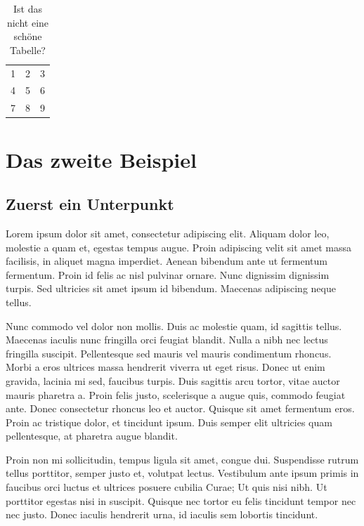 \begin{table}[]
	\begin{center}
		\begin{tabular}{| l c r |}
			\hline
			1 & 2 & 3 \\
			4 & 5 & 6 \\
			7 & 8 & 9 \\
			\hline
		\end{tabular}
	\end{center}
	\caption{Ist das nicht eine schöne Tabelle?}
\end{table}

\section{Das zweite Beispiel}

\subsection{Zuerst ein Unterpunkt}
Lorem ipsum dolor sit amet, consectetur adipiscing elit. Aliquam dolor leo, molestie a quam et, egestas tempus augue. Proin adipiscing velit sit amet massa facilisis, in aliquet magna imperdiet. Aenean bibendum ante ut fermentum fermentum. Proin id felis ac nisl pulvinar ornare. Nunc dignissim dignissim turpis. Sed ultricies sit amet ipsum id bibendum. Maecenas adipiscing neque tellus.

Nunc commodo vel dolor non mollis. Duis ac molestie quam, id sagittis tellus. Maecenas iaculis nunc fringilla orci feugiat blandit. Nulla a nibh nec lectus fringilla suscipit. Pellentesque sed mauris vel mauris condimentum rhoncus. Morbi a eros ultrices massa hendrerit viverra ut eget risus. Donec ut enim gravida, lacinia mi sed, faucibus turpis. Duis sagittis arcu tortor, vitae auctor mauris pharetra a. Proin felis justo, scelerisque a augue quis, commodo feugiat ante. Donec consectetur rhoncus leo et auctor. Quisque sit amet fermentum eros. Proin ac tristique dolor, et tincidunt ipsum. Duis semper elit ultricies quam pellentesque, at pharetra augue blandit.

Proin non mi sollicitudin, tempus ligula sit amet, congue dui. Suspendisse rutrum tellus porttitor, semper justo et, volutpat lectus. Vestibulum ante ipsum primis in faucibus orci luctus et ultrices posuere cubilia Curae; Ut quis nisi nibh. Ut porttitor egestas nisi in suscipit. Quisque nec tortor eu felis tincidunt tempor nec nec justo. Donec iaculis hendrerit urna, id iaculis sem lobortis tincidunt.

